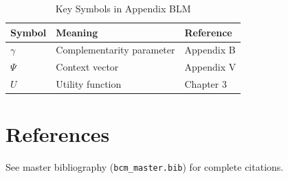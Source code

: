 \begin{table}[htbp]
\centering
\caption{Key Symbols in Appendix BLM}
\begin{tabular}{lll}
\toprule
\textbf{Symbol} & \textbf{Meaning} & \textbf{Reference} \\
\midrule
$\gamma$ & Complementarity parameter & Appendix B \\
$\Psi$ & Context vector & Appendix V \\
$U$ & Utility function & Chapter 3 \\
\bottomrule
\end{tabular}
\end{table}


\section{References}
\label{sec:blm-references}

See master bibliography (\texttt{bcm\_master.bib}) for complete citations.

\nocite{bcm_master}

